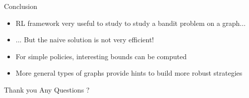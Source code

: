 \documentclass{beamer}
\begin{document}
\begin{frame}{Conclusion}
\begin{itemize}
\item RL framework very useful to study to study a bandit problem on a graph...
\item ... But the naive solution is not very efficient!
\item For simple policies, interesting bounds can be computed
\item More general types of graphs provide hints to build more robust strategies
\end{itemize}

\end{frame}

\begin{frame}{Thank you}
\centering \Huge Any Questions ?
\end{frame}

\begin{frame}
\AtNextBibliography{\tiny}
\printbibliography
\end{frame}
\end{document}
